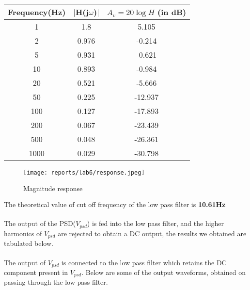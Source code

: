 \documentclass[12pt]{article}
\begin{document}
        \begin{center}
            \begin{tabular}{|c|c|c|}
            \hline
            Frequency(Hz)  &   \(|\)H(j\(\omega\))\(|\) &   \(A_v=20\log{H}\) (in dB) \\
            \hline
            1   &   1.8     &    5.105    \\
            2   &   0.976 &   -0.214    \\
            5   &   0.931 &   -0.621    \\
            10   &   0.893 &   -0.984    \\
            20      &   0.521 &   -5.666    \\
            50      &   0.225   &   -12.937    \\
            100    &   0.127 &   -17.893    \\
            200 &   0.067 &   -23.439    \\
            500    &   0.048 &   -26.361     \\
            1000 &   0.029 &   -30.798    \\
            \hline
            \end{tabular}
        \end{center}
        \begin{figure}[H]
            \centering
            \texttt{[image: reports/lab6/response.jpeg]}
            \caption{Magnitude response}
        \end{figure}
        \noindent
        The theoretical value of cut off frequency of the low pass filter is \textbf{10.61Hz}\\\\
        The output of the PSD(\(V_{psd}\)) is fed into the low pass filter, and the higher harmonics of \(V_{psd}\) are rejected to obtain a DC output, the results we obtained are tabulated below.\\\\
        \noindent
        The output of $V_{psd}$ is connected to the low pass filter which retains the DC component present in $V_{psd}$. Below are some of the output waveforms, obtained on passing through the low pass filter.
\end{document}
